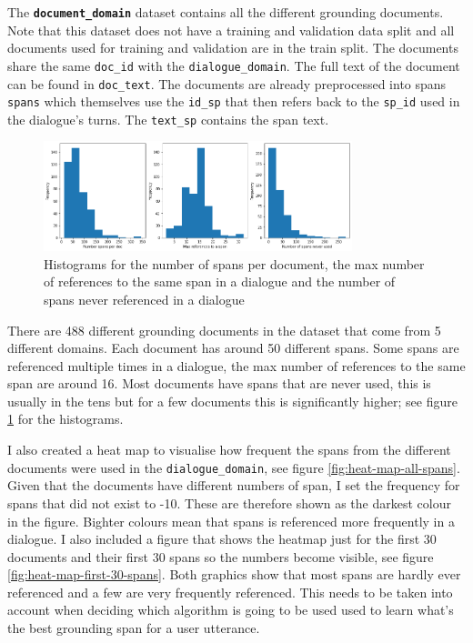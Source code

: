 \documentclass[11pt]{article}
\begin{document}
    The \textbf{\texttt{document\_domain}} dataset contains all the different grounding documents. Note that this dataset does not have
    a training and validation data split and all documents used for training and validation are in the train split.
    The documents share the same \texttt{doc\_id} with the \texttt{dialogue\_domain}. The full text of the document
    can be found in \texttt{doc\_text}. The documents are already preprocessed into spans \texttt{spans} which themselves
    use the \texttt{id\_sp} that then refers back to the \texttt{sp\_id} used in the dialogue's turns. The \texttt{text\_sp}
    contains the span text.

    \begin{figure}[h]
        \centering
        \includegraphics[width=0.8\textwidth]{span_counts}
        \caption{Histograms for the number of spans per document, the max number of references to the same span in a dialogue and the number of
        spans never referenced in a dialogue }
        \label{fig:histogram-spans}
    \end{figure}

    There are 488 different grounding documents in the dataset that come from 5 different domains. Each document has
    around 50 different spans. Some spans are referenced multiple times in a dialogue, the max number of references
    to the same span are around 16. Most documents have spans that are never used, this is usually in the tens but for a few documents
    this is significantly higher; see figure \ref{fig:histogram-spans} for the histograms.

    I also created a heat map to visualise how frequent the spans from the different documents were used in the \texttt{dialogue\_domain},
    see figure \ref{fig:heat-map-all-spans}. Given that the documents have different numbers of span, I set the frequency for spans that did not exist to -10. These
    are therefore shown as the darkest colour in the figure. Bighter colours mean that spans is referenced more frequently in a
    dialogue. I also included a figure that shows the heatmap just for the first 30 documents and their first 30 spans
    so the numbers become visible, see figure \ref{fig:heat-map-first-30-spans}. Both graphics show that most spans
    are hardly ever referenced and a few are very frequently referenced. This needs to be taken into account when
    deciding which algorithm is going to be used used to learn what's the best grounding span for a user utterance.
\end{document}
